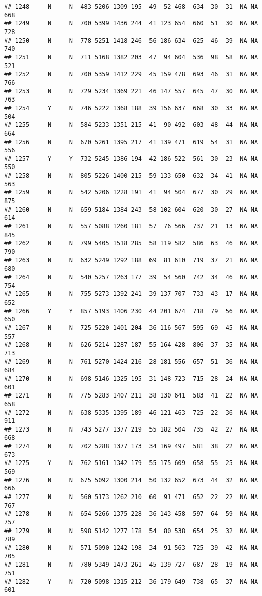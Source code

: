 \documentclass[]{article}
\begin{document}
\begin{verbatim}
## 1248     N     N  483 5206 1309 195  49  52 468  634  30  31  NA NA  668
## 1249     N     N  700 5399 1436 244  41 123 654  660  51  30  NA NA  728
## 1250     N     N  778 5251 1418 246  56 186 634  625  46  39  NA NA  740
## 1251     N     N  711 5168 1382 203  47  94 604  536  98  58  NA NA  521
## 1252     N     N  700 5359 1412 229  45 159 478  693  46  31  NA NA  766
## 1253     N     N  729 5234 1369 221  46 147 557  645  47  30  NA NA  763
## 1254     Y     N  746 5222 1368 188  39 156 637  668  30  33  NA NA  504
## 1255     N     N  584 5233 1351 215  41  90 492  603  48  44  NA NA  664
## 1256     N     N  670 5261 1395 217  41 139 471  619  54  31  NA NA  556
## 1257     Y     Y  732 5245 1386 194  42 186 522  561  30  23  NA NA  550
## 1258     N     N  805 5226 1400 215  59 133 650  632  34  41  NA NA  563
## 1259     N     N  542 5206 1228 191  41  94 504  677  30  29  NA NA  875
## 1260     N     N  659 5184 1384 243  58 102 604  620  30  27  NA NA  614
## 1261     N     N  557 5088 1260 181  57  76 566  737  21  13  NA NA  845
## 1262     N     N  799 5405 1518 285  58 119 582  586  63  46  NA NA  790
## 1263     N     N  632 5249 1292 188  69  81 610  719  37  21  NA NA  680
## 1264     N     N  540 5257 1263 177  39  54 560  742  34  46  NA NA  754
## 1265     N     N  755 5273 1392 241  39 137 707  733  43  17  NA NA  652
## 1266     Y     Y  857 5193 1406 230  44 201 674  718  79  56  NA NA  650
## 1267     N     N  725 5220 1401 204  36 116 567  595  69  45  NA NA  557
## 1268     N     N  626 5214 1287 187  55 164 428  806  37  35  NA NA  713
## 1269     N     N  761 5270 1424 216  28 181 556  657  51  36  NA NA  684
## 1270     N     N  698 5146 1325 195  31 148 723  715  28  24  NA NA  601
## 1271     N     N  775 5283 1407 211  38 130 641  583  41  22  NA NA  658
## 1272     N     N  638 5335 1395 189  46 121 463  725  22  36  NA NA  911
## 1273     N     N  743 5277 1377 219  55 182 504  735  42  27  NA NA  668
## 1274     N     N  702 5288 1377 173  34 169 497  581  38  22  NA NA  673
## 1275     Y     N  762 5161 1342 179  55 175 609  658  55  25  NA NA  569
## 1276     N     N  675 5092 1300 214  50 132 652  673  44  32  NA NA  666
## 1277     N     N  560 5173 1262 210  60  91 471  652  22  22  NA NA  767
## 1278     N     N  654 5266 1375 228  36 143 458  597  64  59  NA NA  757
## 1279     N     N  598 5142 1277 178  54  80 538  654  25  32  NA NA  789
## 1280     N     N  571 5090 1242 198  34  91 563  725  39  42  NA NA  705
## 1281     N     N  780 5349 1473 261  45 139 727  687  28  19  NA NA  751
## 1282     Y     N  720 5098 1315 212  36 179 649  738  65  37  NA NA  601

\end{verbatim}
\end{document}

